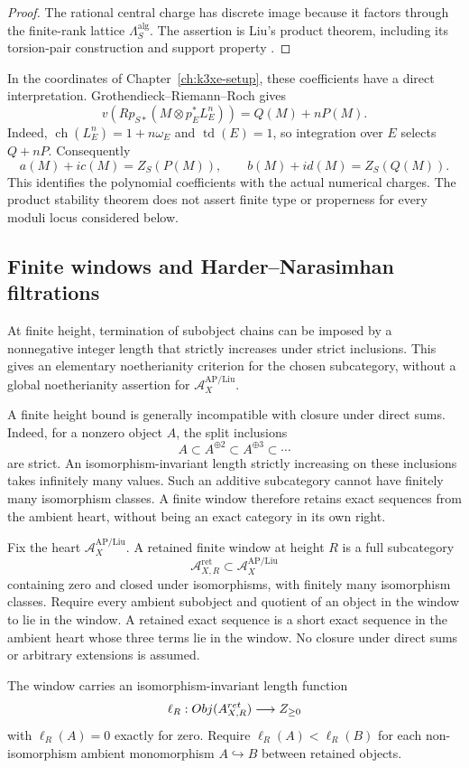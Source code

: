 \begin{proof}
The rational central charge has discrete image because it factors
through the finite-rank lattice $\Lambda_S^{\mathrm{alg}}$.
The assertion is Liu's product theorem, including its torsion-pair
construction and support property
\cite[Theorems~4.7 and 5.9]{LiuProductStability}.
\end{proof}

In the coordinates of Chapter~\ref{ch:k3xe-setup}, these coefficients
have a direct interpretation.  Grothendieck--Riemann--Roch gives
\[
v(Rp_{S*}(M\otimes p_E^*L_E^n))=Q(M)+nP(M).
\]
Indeed, $\operatorname{ch}(L_E^n)=1+n\omega_E$ and
$\operatorname{td}(E)=1$, so integration over $E$ selects $Q+nP$.
Consequently
\[
a(M)+ic(M)=Z_S(P(M)),\qquad
b(M)+id(M)=Z_S(Q(M)).
\]
This identifies the polynomial coefficients with the actual numerical
charges.  The product stability theorem does not assert finite type
or properness for every moduli locus considered below.

\subsection{Finite windows and Harder--Narasimhan filtrations}

At finite height, termination of subobject chains can be imposed by
a nonnegative integer length that strictly increases under strict
inclusions.  This gives an elementary noetherianity criterion for the
chosen subcategory, without a global noetherianity assertion for
\(\mathcal A_X^{\mathrm{AP/Liu}}\).

A finite height bound is generally incompatible with closure under
direct sums.  Indeed, for a nonzero object \(A\), the split inclusions
\[
A\subset A^{\oplus2}\subset A^{\oplus3}\subset\cdots
\]
are strict.  An isomorphism-invariant length strictly increasing on
these inclusions takes infinitely many values.  Such an additive
subcategory cannot have finitely many isomorphism classes.  A finite
window therefore retains exact sequences from the ambient heart,
without being an exact category in its own right.

\begin{definition}
\label{def:retained-noetherian-window}
Fix the heart \(\mathcal A_X^{\mathrm{AP/Liu}}\).  A retained finite
window at height \(R\) is a full subcategory
\[
\mathcal A_{X,R}^{\mathrm{ret}}\subset\mathcal A_X^{\mathrm{AP/Liu}}
\]
containing zero and closed under isomorphisms, with finitely many
isomorphism classes.  Require every ambient subobject and quotient
of an object in the window to lie in the window.  A retained exact
sequence is a short exact sequence in the ambient heart whose three
terms lie in the window.  No closure under direct sums or arbitrary
extensions is assumed.

The window carries an isomorphism-invariant length function
\[
\ell_R:Obj(A_{X,R}^{ret})
\longrightarrow Z_{\ge0}
\]
with \(\ell_R(A)=0\) exactly for zero.
Require \(\ell_R(A)<\ell_R(B)\) for each non-isomorphism ambient
monomorphism \(A\hookrightarrow B\) between retained objects.
\end{definition}

